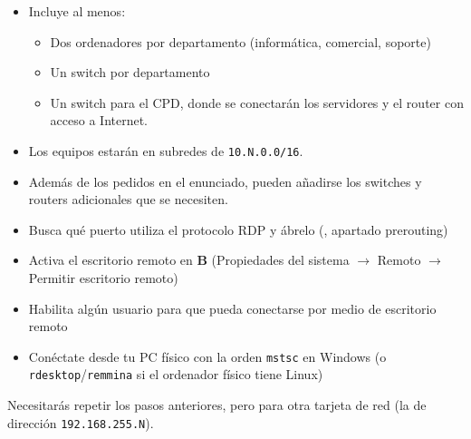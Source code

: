 \begin{homeworkProblem}
  \begin{itemize}
  \item Incluye al menos:
    \begin{itemize}
    \item Dos ordenadores por departamento (informática, comercial, soporte)
    \item Un switch por departamento
    \item Un switch para el CPD, donde se conectarán los servidores y el router con acceso a Internet.
    \end{itemize}
  \item Los equipos estarán en subredes de \texttt{10.N.0.0/16}.
    
  \item Además de los pedidos en el enunciado, pueden añadirse los switches y routers adicionales que se necesiten.
  \end{itemize}
\end{homeworkProblem}

\begin{homeworkProblem}
  \begin{itemize}
    
  \item Busca qué puerto utiliza el protocolo RDP y ábrelo (, apartado prerouting)
  \item Activa el escritorio remoto en \textbf{B} (Propiedades del sistema $\rightarrow$ Remoto $\rightarrow$ Permitir escritorio remoto)
    
  \item Habilita algún usuario para que pueda conectarse por medio de escritorio remoto
  \item Conéctate desde tu PC físico con la orden \texttt{mstsc} en  Windows (o \texttt{rdesktop}/\texttt{remmina} si el ordenador físico tiene Linux)
  \end{itemize}

\end{homeworkProblem}


\begin{homeworkProblem}
  Necesitarás repetir los pasos anteriores, pero para otra tarjeta de red (la de dirección \texttt{192.168.255.N}).
\end{homeworkProblem}


